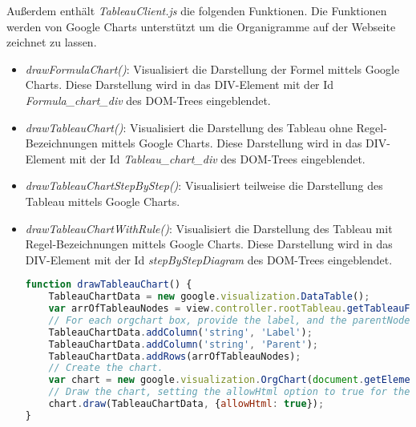 Außerdem enthält \textit{TableauClient.js} die folgenden Funktionen. Die Funktionen werden von Google Charts unterstützt um die  Organigramme auf der Webseite zeichnet zu lassen. 
\begin{itemize}
\item	\textit{drawFormulaChart()}: Visualisiert die Darstellung der Formel mittels Google Charts. Diese Darstellung wird in das DIV-Element mit der Id \textit{Formula\_chart\_div} des DOM-Trees eingeblendet.
\item	\textit{drawTableauChart()}: Visualisiert die Darstellung des Tableau ohne Regel-Bezeichnungen mittels Google Charts. Diese Darstellung wird in das DIV-Element mit der Id \textit{Tableau\_chart\_div} des DOM-Trees eingeblendet.
\item	\textit{drawTableauChartStepByStep()}: Visualisiert teilweise die Darstellung des Tableau mittels Google Charts.
\item	\textit{drawTableauChartWithRule()}: Visualisiert die Darstellung des Tableau mit Regel-Bezeichnungen mittels Google Charts. Diese Darstellung wird in das DIV-Element mit der Id \textit{stepByStepDiagram} des DOM-Trees eingeblendet.
\begin{lstlisting}[language=JavaScript, caption= drawTableauChart() (TableauClient.js), basicstyle=\scriptsize] 
function drawTableauChart() {
    TableauChartData = new google.visualization.DataTable();
    var arrOfTableauNodes = view.controller.rootTableau.getTableauForChart();
    // For each orgchart box, provide the label, and the parentNode
    TableauChartData.addColumn('string', 'Label');
    TableauChartData.addColumn('string', 'Parent');
    TableauChartData.addRows(arrOfTableauNodes);
    // Create the chart.
    var chart = new google.visualization.OrgChart(document.getElementById('Tableau_chart_div'));
    // Draw the chart, setting the allowHtml option to true for the tooltips.
    chart.draw(TableauChartData, {allowHtml: true});
}
\end{lstlisting}
\end{itemize}

